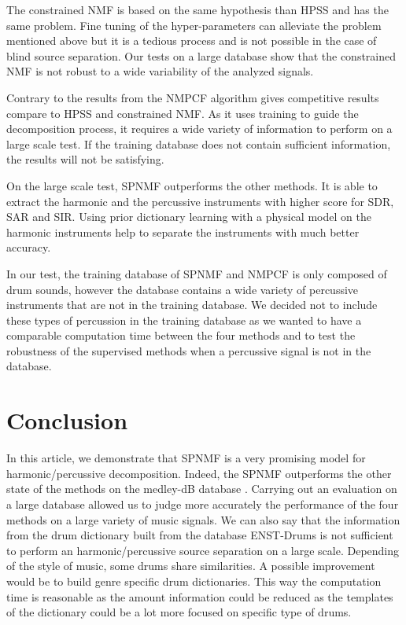 \documentclass[journal]{IEEEtran}
\begin{document}
The constrained NMF is based on the same hypothesis than HPSS and has the same problem. Fine tuning of the hyper-parameters can alleviate the problem mentioned above but it is a tedious process and is not possible in the case of blind source separation. Our tests on a large database show that the constrained NMF is not robust to a wide variability of the analyzed signals.

Contrary to the results from \cite{canadas2014percussive} the NMPCF algorithm gives competitive results compare to HPSS and constrained NMF. As it uses training to guide the decomposition process, it requires a wide variety of information to perform on a large scale test. If the training database does not contain sufficient information, the results will not be satisfying. 

On the large scale test, SPNMF outperforms the other methods. It is able to extract the harmonic and the percussive instruments with higher score for SDR, SAR and SIR. Using prior dictionary learning with a physical model on the harmonic instruments help to separate the instruments with much better accuracy.

In our test, the training database of SPNMF and NMPCF is only composed of drum sounds, however the database \cite{bittner2014medleydb} contains a wide variety of percussive instruments that are not in the training database. We decided not to include these types of percussion in the training database as we wanted to have a comparable computation time between the four methods and to test the robustness of the supervised methods when a percussive signal is not in the database. 


\section{Conclusion}
\label{sec:conc}

In this article, we demonstrate that SPNMF is a very promising model for harmonic/percussive decomposition. Indeed, the SPNMF outperforms the other state of the methods on the medley-dB database \cite{bittner2014medleydb}. Carrying out an evaluation on a large database allowed us to judge more accurately the performance of the four methods on a large variety of music signals. We can also say that the information from the drum dictionary built from the database ENST-Drums \cite{gillet2006enst} is not sufficient to perform an harmonic/percussive source separation on a large scale. Depending of the style of music, some drums share similarities. A possible improvement would be to build genre specific drum dictionaries. This way the computation time is reasonable as the amount information could be reduced as the templates of the dictionary could be a lot more focused on specific type of drums. 
\end{document}
